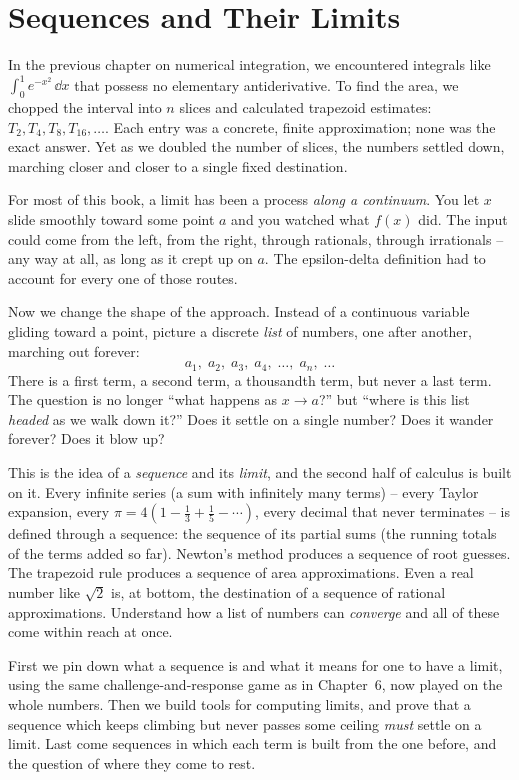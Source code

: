 \chapter{Sequences and Their Limits}

In the previous chapter on numerical integration, we encountered integrals like
$\int_0^1 e^{-x^2}\,\dd x$ that possess no elementary antiderivative. To find
the area, we chopped the interval into $n$ slices and calculated trapezoid
estimates: $T_2, T_4, T_8, T_{16}, \dots$. Each entry was a concrete, finite
approximation; none was the exact answer. Yet as we doubled the number of
slices, the numbers settled down, marching closer and closer to a single fixed
destination.

For most of this book, a limit has been a process \emph{along a continuum}. You
let $x$ slide smoothly toward some point $a$ and you watched what $f(x)$ did. The
input could come from the left, from the right, through rationals, through
irrationals -- any way at all, as long as it crept up on $a$. The epsilon-delta
definition had to account for every one of those routes.

Now we change the shape of the approach. Instead of a continuous variable
gliding toward a point, picture a discrete \emph{list} of numbers, one after
another, marching out forever:
\[
  a_1,\; a_2,\; a_3,\; a_4,\; \dots,\; a_n,\; \dots
\]
There is a first term, a second term, a thousandth term, but never a last term.
The question is no longer ``what happens as $x \to a$?'' but ``where is this list
\emph{headed} as we walk down it?'' Does it settle on a single number? Does it
wander forever? Does it blow up?

This is the idea of a \emph{sequence} and its \emph{limit}, and the second half
of calculus is built on it. Every infinite series (a sum with infinitely many
terms) -- every Taylor expansion,
every $\pi = 4(1 - \tfrac13 + \tfrac15 - \cdots)$, every decimal that never
terminates -- is defined through a sequence: the sequence of its partial
sums (the running totals of the terms added so far). Newton's method produces a
sequence of root guesses. The trapezoid rule produces a sequence of area
approximations. Even a real number like $\sqrt{2}$ is, at bottom, the destination
of a sequence of rational approximations. Understand how a list of numbers can
\emph{converge} and all of these come within reach at once.

First we pin down what a sequence is and what it means for one to have a
limit, using the same challenge-and-response game as in Chapter~6, now played
on the whole numbers. Then we build tools for computing limits, and prove that a
sequence which keeps climbing but never passes some ceiling \emph{must} settle
on a limit. Last come sequences in which each term is built from the one
before, and the question of where they come to rest.

